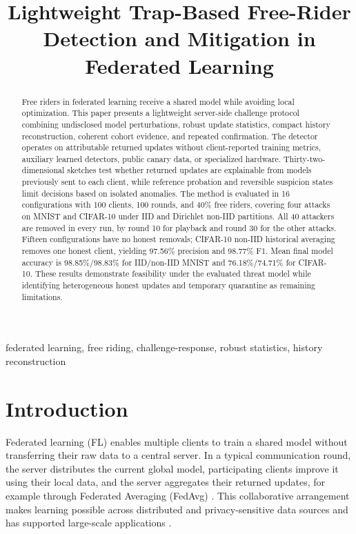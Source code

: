 \documentclass[conference]{IEEEtran}
\title{Lightweight Trap-Based Free-Rider Detection and Mitigation in Federated Learning}
\author{\IEEEauthorblockN{Aashnan Rahman}
\IEEEauthorblockA{Department of Computer Science and Engineering\\
Islamic University of Technology\\
MSc Thesis}}
\begin{document}
\raggedbottom
\maketitle
{}


\begin{abstract}
Free riders in federated learning receive a shared model while avoiding local optimization. This paper presents a lightweight server-side challenge protocol combining undisclosed model perturbations, robust update statistics, compact history reconstruction, coherent cohort evidence, and repeated confirmation. The detector operates on attributable returned updates without client-reported training metrics, auxiliary learned detectors, public canary data, or specialized hardware. Thirty-two-dimensional sketches test whether returned updates are explainable from models previously sent to each client, while reference probation and reversible suspicion states limit decisions based on isolated anomalies. The method is evaluated in 16 configurations with 100 clients, 100 rounds, and 40\% free riders, covering four attacks on MNIST and CIFAR-10 under IID and Dirichlet non-IID partitions. All 40 attackers are removed in every run, by round 10 for playback and round 30 for the other attacks. Fifteen configurations have no honest removals; CIFAR-10 non-IID historical averaging removes one honest client, yielding 97.56\% precision and 98.77\% F1. Mean final model accuracy is 98.85\%/98.83\% for IID/non-IID MNIST and 76.18\%/74.71\% for CIFAR-10. These results demonstrate feasibility under the evaluated threat model while identifying heterogeneous honest updates and temporary quarantine as remaining limitations.
\end{abstract}
\begin{IEEEkeywords}
federated learning, free riding, challenge-response, robust statistics, history reconstruction
\end{IEEEkeywords}
\section{Introduction}

Federated learning (FL) enables multiple clients to train a shared model without transferring their raw data to a central server. In a typical communication round, the server distributes the current global model, participating clients improve it using their local data, and the server aggregates their returned updates, for example through Federated Averaging (FedAvg) \cite{mcmahan2017communication}. This collaborative arrangement makes learning possible across distributed and privacy-sensitive data sources and has supported large-scale applications \cite{bonawitz2019towards,hard2018federated}.
\end{document}
